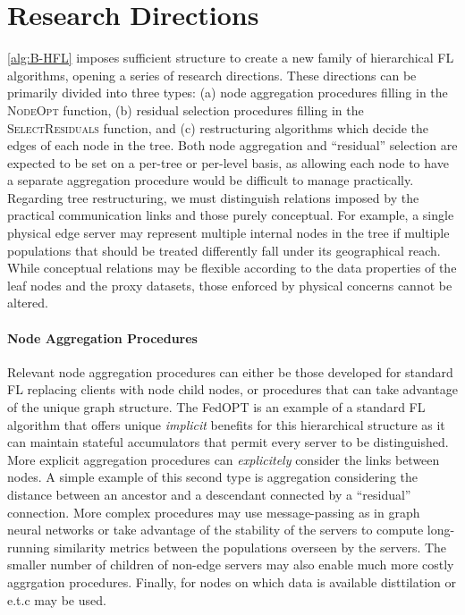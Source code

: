 \section{Research Directions}\label{sec:proposal:research_directions}
\cref{alg:B-HFL} imposes sufficient structure to create a new family of hierarchical FL algorithms, opening a series of research directions. These directions can be primarily divided into three types: (a) node aggregation procedures filling in the \textsc{NodeOpt} function, (b) residual selection procedures filling in the \textsc{SelectResiduals} function, and (c) restructuring algorithms which decide the edges of each node in the tree. Both node aggregation and ``residual'' selection are expected to be set on a per-tree or per-level basis, as allowing each node to have a separate aggregation procedure would be difficult to manage practically. Regarding tree restructuring, we must distinguish relations imposed by the practical communication links and those purely conceptual. For example, a single physical edge server may represent multiple internal nodes in the tree if multiple populations that should be treated differently fall under its geographical reach. While conceptual relations may be flexible according to the data properties of the leaf nodes and the proxy datasets, those enforced by physical concerns cannot be altered.

\paragraph{Node Aggregation Procedures} Relevant node aggregation procedures can either be those developed for standard FL replacing clients with node child nodes, or procedures that can take advantage of the unique graph structure. The FedOPT is an example of a standard FL algorithm that offers unique \emph{implicit} benefits for this hierarchical structure as it can maintain stateful accumulators that permit every server to be distinguished. More explicit aggregation procedures can \emph{explicitely} consider the links between nodes. A simple example of this second type is aggregation considering the distance between an ancestor and a descendant connected by a ``residual'' connection. More complex procedures may use message-passing as in graph neural networks  or take advantage of the stability of the servers to compute long-running similarity metrics between the populations overseen by the servers. The smaller number of children of non-edge servers may also enable much more costly aggrgation procedures. Finally, for nodes on which data is available disttilation or e.t.c may be used.
